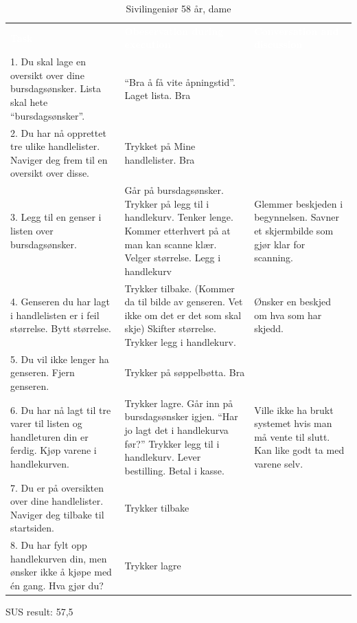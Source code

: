 \begin{table}[H]
    \caption{Sivilingeniør 58 år, dame}
    \label{tab:observasjon1_1}
    \centering
    \begin{tabular}{L{15em}  L{15em} L{15em}}
        \textbf{\textcolor{white}{Task}} & \textbf{\textcolor{white}{Obeservation during execution}} & \textbf{\textcolor{white}{Conversation and discussion}}\\
        1. Du skal lage en oversikt over dine bursdagsønsker. Lista skal hete “bursdagsønsker”. & “Bra å få vite åpningstid”. Laget lista. Bra & \\
        2. Du har nå opprettet tre ulike handlelister. Naviger deg frem til en oversikt over disse. & Trykket på Mine handlelister. Bra &  \\
        3. Legg til en genser i listen over bursdagsønsker. & Går på bursdagsønsker. Trykker på legg til i handlekurv. Tenker lenge. Kommer etterhvert på at man kan scanne klær. Velger størrelse. Legg i handlekurv & Glemmer beskjeden i begynnelsen. Savner et skjermbilde som gjør klar for scanning.\\ 
        4. Genseren du har lagt i handlelisten er i feil størrelse. Bytt størrelse. & Trykker tilbake. (Kommer da til bilde av genseren. Vet ikke om det er det som skal skje) Skifter størrelse. Trykker legg i handlekurv. & Ønsker en beskjed om hva som har skjedd.\\
        5. Du vil ikke lenger ha genseren. Fjern genseren. & Trykker på søppelbøtta. Bra & \\
        6. Du har nå lagt til tre varer til listen og handleturen din er ferdig. Kjøp varene i handlekurven. & Trykker lagre. Går inn på bursdagsønsker igjen. “Har jo lagt det i handlekurva før?” Trykker legg til i handlekurv. Lever bestilling. Betal i kasse. & Ville ikke ha brukt systemet hvis man må vente til slutt. Kan like godt ta med varene selv.\\
        7. Du er på oversikten over dine handlelister. Naviger deg tilbake til startsiden. & Trykker tilbake & \\
        8. Du har fylt opp handlekurven din, men ønsker ikke å kjøpe med én gang. Hva gjør du? & Trykker lagre & \\
    \end{tabular}
\end{table}

\noindent SUS result: 57,5

